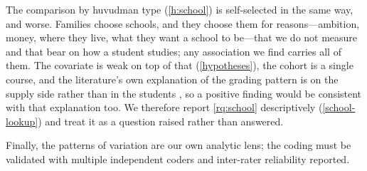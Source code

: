 The comparison by huvudman type (\cref{h:school}) is self-selected in the
same way, and worse.
Families choose schools, and they choose them for reasons---ambition,
money, where they live, what they want a school to be---that we do not
measure and that bear on how a student studies; any association we find
carries all of them.
The covariate is weak on top of that (\cref{hypotheses}), the cohort is a
single course, and the literature's own explanation of the grading pattern
is on the supply side rather than in the students
\autocite[pp.~40--41]{HinnerichVlachos2017}, so a positive finding would be
consistent with that explanation too.
We therefore report \cref{rq:school} descriptively (\cref{school-lookup})
and treat it as a question raised rather than answered.

Finally, the patterns of variation are our own analytic lens; the coding must
be validated with multiple independent coders and inter-rater reliability
reported.

